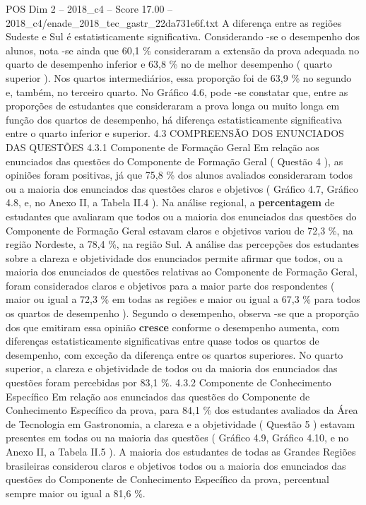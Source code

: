 \begin{textsample}{POS Dim 2 – 2018\_c4 – Score 17.00 – 2018\_c4/enade\_2018\_tec\_gastr\_22da731e6f.txt}
A diferença entre as regiões Sudeste e Sul é estatisticamente significativa.
Considerando -se o desempenho dos alunos, nota -se ainda que 60,1 \% consideraram a extensão da prova adequada no quarto de desempenho inferior e 63,8 \% no de melhor desempenho ( quarto superior ).
Nos quartos intermediários, essa proporção foi de 63,9 \% no segundo e, também, no terceiro quarto.
No Gráfico 4.6, pode -se constatar que, entre as proporções de estudantes que consideraram a prova longa ou muito longa em função dos quartos de desempenho, há diferença estatisticamente significativa entre o quarto inferior e superior. 4.3 COMPREENSÃO DOS ENUNCIADOS DAS QUESTÕES 4.3.1 Componente de Formação Geral Em relação aos enunciados das questões do Componente de Formação Geral ( Questão 4 ), as opiniões foram positivas, já que 75,8 \% dos alunos avaliados consideraram todos ou a maioria dos enunciados das questões claros e objetivos ( Gráfico 4.7, Gráfico 4.8, e, no Anexo II, a Tabela II.4 ).
Na análise regional, a \textbf{percentagem} de estudantes que avaliaram que todos ou a maioria dos enunciados das questões do Componente de Formação Geral estavam claros e objetivos variou de 72,3 \%, na região Nordeste, a 78,4 \%, na região Sul.
A análise das percepções dos estudantes sobre a clareza e objetividade dos enunciados permite afirmar que todos, ou a maioria dos enunciados de questões relativas ao Componente de Formação Geral, foram considerados claros e objetivos para a maior parte dos respondentes ( maior ou igual a 72,3 \% em todas as regiões e maior ou igual a 67,3 \% para todos os quartos de desempenho ).
Segundo o desempenho, observa -se que a proporção dos que emitiram essa opinião \textbf{cresce} conforme o desempenho aumenta, com diferenças estatisticamente significativas entre quase todos os quartos de desempenho, com exceção da diferença entre os quartos superiores.
No quarto superior, a clareza e objetividade de todos ou da maioria dos enunciados das questões foram percebidas por 83,1 \%. 4.3.2 Componente de Conhecimento Específico Em relação aos enunciados das questões do Componente de Conhecimento Específico da prova, para 84,1 \% dos estudantes avaliados da Área de Tecnologia em Gastronomia, a clareza e a objetividade ( Questão 5 ) estavam presentes em todas ou na maioria das questões ( Gráfico 4.9, Gráfico 4.10, e no Anexo II, a Tabela II.5 ).
A maioria dos estudantes de todas as Grandes Regiões brasileiras considerou claros e objetivos todos ou a maioria dos enunciados das questões do Componente de Conhecimento Específico da prova, percentual sempre maior ou igual a 81,6 \%.

\end{textsample}
